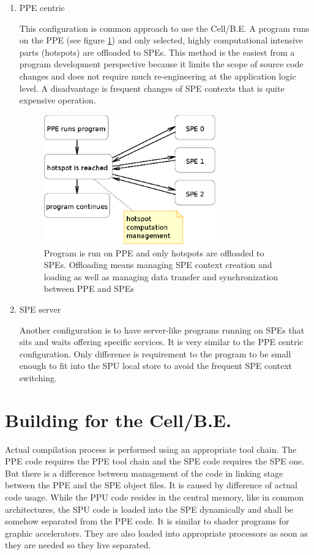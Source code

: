\begin{enumerate}
\item PPE centric
\par
This configuration is common approach to use the \mbox{Cell/B.E.}
A program runs on the PPE (see figure \ref{fg:PPUCentricModel}) and only selected, highly computational intensive parts (hotspots) are offloaded to SPEs.
This method is the easiest from a program development perspective because it limits the scope of source code changes and does not require much re-engineering at the application logic level.
A disadvantage is frequent changes of SPE contexts that is quite expensive operation.\\

\begin{figure}
    \centering
    \includegraphics[width=0.7\textwidth]{data/PPUCentricModel}
    \caption[PPE centric configuration]{Program is run on PPE and only hotspots are offloaded to SPEs.
 Offloading means managing SPE context creation and loading as well as managing data transfer and synchronization between PPE and SPEs}
    \label{fg:PPUCentricModel}
\end{figure}

\item SPE server
\par
Another configuration is to have server-like programs running on SPEs that sits and waits offering specific services.
It is very similar to the PPE centric configuration.
Only difference is requirement to the program to be small enough to fit into the SPU local store to avoid the frequent SPE context switching.

\end{enumerate}

\section {Building for the \mbox{Cell/B.E.}}
\par
Actual compilation process is performed using an appropriate tool chain.
The PPE code requires the PPE tool chain and the SPE code requires the SPE one.
But there is a difference between management of the code in linking stage between the PPE and the SPE object files.
It is caused by difference of actual code usage.
While the PPU code resides in the central memory, like in common architectures, the SPU code is loaded into the SPE dynamically and shall be somehow separated from the PPE code.
It is similar to shader programs for graphic accelerators.
They are also loaded into appropriate processors as soon as they are needed so they live separated.

